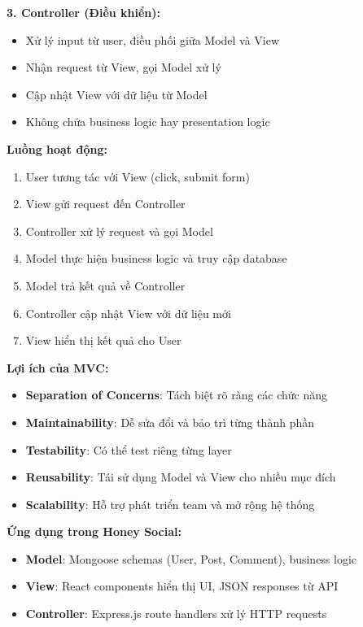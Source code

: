 \textbf{3. Controller (Điều khiển):}
\begin{itemize}
\item Xử lý input từ user, điều phối giữa Model và View
\item Nhận request từ View, gọi Model xử lý
\item Cập nhật View với dữ liệu từ Model
\item Không chứa business logic hay presentation logic
\end{itemize}

\textbf{Luồng hoạt động:}
\begin{enumerate}
\item User tương tác với View (click, submit form)
\item View gửi request đến Controller
\item Controller xử lý request và gọi Model
\item Model thực hiện business logic và truy cập database
\item Model trả kết quả về Controller
\item Controller cập nhật View với dữ liệu mới
\item View hiển thị kết quả cho User
\end{enumerate}

\textbf{Lợi ích của MVC:}
\begin{itemize}
\item \textbf{Separation of Concerns}: Tách biệt rõ ràng các chức năng
\item \textbf{Maintainability}: Dễ sửa đổi và bảo trì từng thành phần
\item \textbf{Testability}: Có thể test riêng từng layer
\item \textbf{Reusability}: Tái sử dụng Model và View cho nhiều mục đích
\item \textbf{Scalability}: Hỗ trợ phát triển team và mở rộng hệ thống
\end{itemize}

\textbf{Ứng dụng trong Honey Social:}
\begin{itemize}
\item \textbf{Model}: Mongoose schemas (User, Post, Comment), business logic
\item \textbf{View}: React components hiển thị UI, JSON responses từ API
\item \textbf{Controller}: Express.js route handlers xử lý HTTP requests
\end{itemize}




